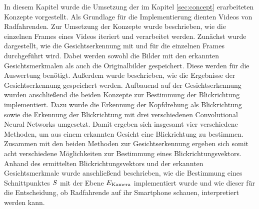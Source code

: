 In diesem Kapitel wurde die Umsetzung der im Kapitel \ref{sec:concept} erarbeiteten Konzepte vorgestellt. Als Grundlage für die Implementierung dienten Videos von Radfahrenden. Zur Umsetzung der Konzepte wurde beschrieben, wie die einzelnen Frames eines Videos iteriert und verarbeitet werden.  Zunächst wurde dargestellt, wie die Gesichtserkennung mit \dlib \cite{paper:dlib:main} und \mediapipe \cite{paper:mediapipe} für die einzelnen Frames durchgeführt wird. Dabei werden sowohl die Bilder mit den erkannten Gesichtsmerkmalen als auch die Originalbilder gespeichert. Diese werden für die Auswertung benötigt. Außerdem wurde beschrieben, wie die Ergebnisse der Gesichtserkennung gespeichert werden. Aufbauend auf der Gesichtserkennung wurden anschließend die beiden Konzepte zur Bestimmung der Blickrichtung implementiert. Dazu wurde die Erkennung der Kopfdrehung als Blickrichtung sowie die Erkennung der Blickrichtung mit drei verschiedenen Convolutional Neural Networks umgesetzt. Damit ergeben sich insgesamt vier verschiedene Methoden, um aus einem erkannten Gesicht eine Blickrichtung zu bestimmen. Zusammen mit den beiden Methoden zur Gesichtserkennung ergeben sich somit acht verschiedene Möglichkeiten zur Bestimmung eines Blickrichtungsvektors. Anhand des ermittelten Blickrichtungsvektors und der erkannten Gesichtsmerkmale wurde anschließend beschrieben, wie die Bestimmung eines Schnittpunktes $S$ mit der Ebene $E_{\text{Kamera}}$ implementiert wurde und wie dieser für die Entscheidung, ob Radfahrende auf ihr Smartphone schauen, interpretiert werden kann.









